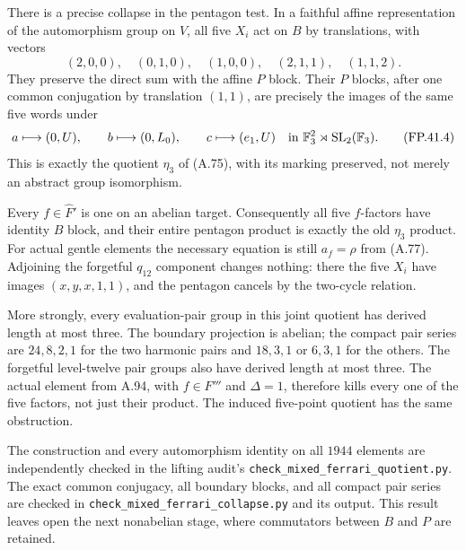 There is a precise collapse in the pentagon test. In a faithful
affine representation of the automorphism group on $V$, all
five $X_i$ act on $B$ by translations, with vectors
\[
 (2,0,0),\quad(0,1,0),\quad(1,0,0),\quad
 (2,1,1),\quad(1,1,2).
 \tag{FP.41.3}
\]
They preserve the direct sum with the affine $P$ block. Their
$P$ blocks, after one common conjugation by translation $(1,1)$,
are precisely the images of the same five words under
\[
 a\longmapsto(0,U),\qquad
 b\longmapsto(0,L_0),\qquad
 c\longmapsto(e_1,U)
 \quad\hbox{in }\mathbb F_3^2\rtimes\operatorname{SL}_2(\mathbb F_3).
 \tag{FP.41.4}
\]
This is exactly the quotient $\eta_3$ of (A.75), with its
marking preserved, not merely an abstract group isomorphism.

Every $f\in\widehat F'$ is one on an abelian target.
Consequently all five $f$-factors have identity $B$ block,
and their entire pentagon product is exactly the old
$\eta_3$ product. For actual gentle elements the necessary
equation is still $a_f=\rho$ from (A.77). Adjoining the
forgetful $q_{12}$ component changes nothing: there the
five $X_i$ have images $(x,y,x,1,1)$, and the pentagon
cancels by the two-cycle relation.

More strongly, every evaluation-pair group in this joint
quotient has derived length at most three. The boundary
projection is abelian; the compact pair series are
$24,8,2,1$ for the two harmonic pairs and
$18,3,1$ or $6,3,1$ for the others. The forgetful level-twelve
pair groups also have derived length at most three.
The actual element from A.94, with $f\in F'''$ and
$\Delta=1$, therefore kills every one of the five factors,
not just their product. The induced five-point quotient has
the same obstruction.

The construction and every automorphism identity on all $1944$
elements are independently checked in the lifting audit's
\texttt{check\_mixed\_ferrari\_quotient.py}. The exact common
conjugacy, all boundary blocks, and all compact pair series
are checked in \texttt{check\_mixed\_ferrari\_collapse.py} and
its output. This result leaves open the next nonabelian
stage, where commutators between $B$ and $P$ are retained.

